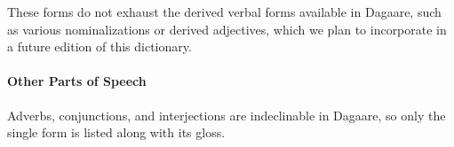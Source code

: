 \begin{refsection}
These forms do not exhaust the derived verbal forms available in Dagaare, such as various nominalizations or derived adjectives, which we plan to incorporate in a future edition of this dictionary.

\paragraph*{Other Parts of Speech}

Adverbs, conjunctions, and interjections are indeclinable in Dagaare, so only the single form is listed along with its gloss.



\printbibliography[heading=subbibliography]
\end{refsection}
